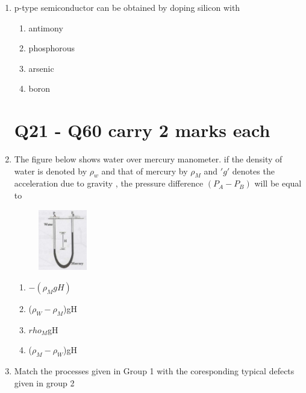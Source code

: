 \documentclass[journal]{IEEEtran}
\theoremstyle{remark}
\begin{document}
\begin{enumerate}
\item p-type semiconductor can be obtained by doping silicon with\hfill{}
\begin{multicols}{4}
\begin{enumerate}
\item antimony
\item phosphorous
\item arsenic
\item boron
\end{enumerate}
\end{multicols}

\section{Q21 - Q60 carry 2 marks each}
\item The figure below shows water over mercury manometer. if the density of water is denoted by $\rho_w$ and that of mercury by $\rho_M$ and $'g'$ denotes the acceleration due to gravity , the pressure difference $(P_A - P_B)$ will be equal to\hfill{}
\begin{figure}[h]
    \centering
    \includegraphics[width=0.2\textwidth]{figs/Q.21.png}
    \caption{}
    \label{fig:21}
\end{figure}
\begin{multicols}{4}
\begin{enumerate}
    \item $-(\rho_M gH)$
    \item ($ \rho_W  -\rho_M$)gH
    \item  $rho_M$gH
    \item ($\rho_M-\rho_W$)gH
\end{enumerate}
\end{multicols}
\item Match the processes given in Group 1 with the coresponding typical defects given in group 2\hfill{}\\
\begin{center}
\begin{tabular}{c c}
 

\end{tabular}
\end{center}
\end{enumerate}
\end{document}
